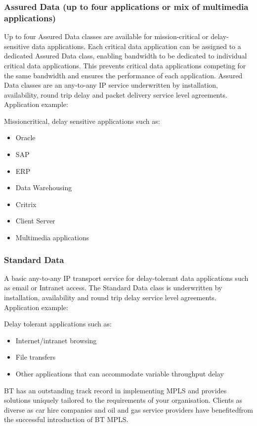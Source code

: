 \subsubsection{Assured Data (up to four applications or mix of multimedia applications)}
Up to four Assured Data classes are available for mission-critical or delay-sensitive data applications. Each critical data application can be assigned to a dedicated Assured Data class, enabling bandwidth to be dedicated to individual critical data applications. This prevents critical data applications competing for the same bandwidth and ensures the performance of each application. Assured Data classes are an any-to-any IP service underwritten by installation, availability, round trip delay and packet delivery service level agreements.
Application example:

Missioncritical, delay sensitive applications such as:
\begin{itemize}
\item Oracle
\item SAP
\item ERP
\item Data Warehousing
\item Critrix
\item Client Server
\item Multimedia applications
\end{itemize}

\subsubsection{Standard Data}
A basic any-to-any IP transport service for delay-tolerant data applications such as email or Intranet access. The Standard Data class is underwritten by installation, availability and round trip delay service level agreements.
Application example:

Delay tolerant applications such as:
\begin{itemize}
\item Internet/intranet browsing
\item File transfers
\item Other applications that can accommodate variable throughput delay
\end{itemize}


BT has an outstanding track record in implementing MPLS and provides solutions uniquely tailored to the requirements of your organisation. Clients as diverse as car hire companies and oil and gas service providers have benefitedfrom the successful introduction of BT MPLS.

